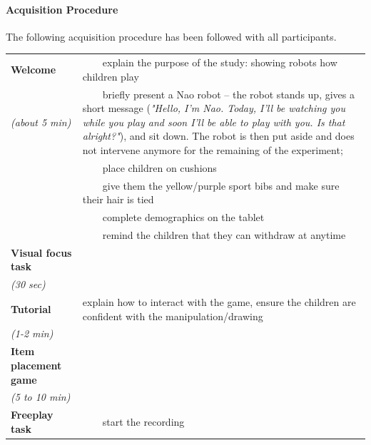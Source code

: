 \documentclass{article}
\begin{document}
\paragraph{Acquisition Procedure}

The following acquisition procedure has been followed with all participants.

\newcommand{\tabitem}{~~\llap{\textbullet}~~}
    \begin{tabular}{@{}p{0.2\linewidth}p{0.8\linewidth}@{}}
\toprule
\bf Welcome                       & \tabitem explain the purpose of the study: showing robots how children play  \\
\emph{(about 5 min)}              & \tabitem briefly present a Nao robot -- the robot stands up, gives a short
                                    message (\emph{"Hello, I'm Nao. Today, I'll be watching you while you
                                    play and soon I'll be able to play with you. Is that alright?"}), and
                                    sit down. The robot is then put aside and does not intervene anymore
                                    for the remaining of the experiment; \\
                                  & \tabitem place children on cushions  \\ 
                                  & \tabitem give them the yellow/purple sport
                                  bibs and make sure their hair is tied \\ 
                                  & \tabitem complete demographics on the tablet \\
                                  & \tabitem remind the children that they can withdraw at anytime \\ \midrule
\bf Visual focus task             &  \\ 
\emph{(30 sec)}                   &  \\ \midrule
\bf Tutorial                      & explain how to interact with the game, ensure the children are confident with the manipulation/drawing \\ 
\emph{(1-2 min)}                  &  \\ \midrule
\bf Item placement game           &  \\
\emph{(5 to 10 min)}              &  \\ \midrule
\bf Freeplay task                 & \tabitem start the recording \\

\end{tabular}
\end{document}
